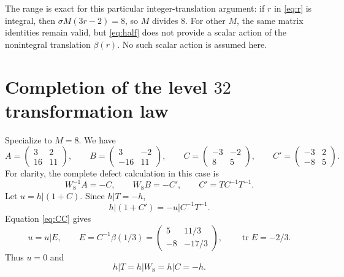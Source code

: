\documentclass[11pt]{article}
\theoremstyle{remark}
\newcommand{\bb}{\beta}
\newcommand{\tr}{\operatorname{tr}}
\begin{document}
The range is exact for this particular integer-translation argument:
if $r$ in \eqref{eq:r} is integral, then
$\sigma M(3r-2)=8$, so $M$ divides $8$. For other $M$, the same
matrix identities remain valid, but \eqref{eq:half} does not provide
a scalar action of the nonintegral translation $\bb(r)$.
No such scalar action is assumed here.

\section{Completion of the level \texorpdfstring{$32$}{32} transformation law}

Specialize to $M=8$. We have
\[
 A=\begin{pmatrix}3&2\\16&11\end{pmatrix},\qquad
 B=\begin{pmatrix}3&-2\\-16&11\end{pmatrix},\qquad
 C=\begin{pmatrix}-3&-2\\8&5\end{pmatrix},\qquad
 C'=\begin{pmatrix}-3&2\\-8&5\end{pmatrix}.
\]
For clarity, the complete defect calculation in this case is
\[
 W_8^{-1}A=-C,\qquad W_8B=-C',\qquad C'=TC^{-1}T^{-1}.
\]
Let $u=h|(1+C)$. Since $h|T=-h$,
\[
 h|(1+C')=-u|C^{-1}T^{-1}.
\]
Equation \eqref{eq:CC} gives
\begin{equation}\label{eq:explicitE}
 u=u|E,\qquad
 E=C^{-1}\bb(1/3)
  =\begin{pmatrix}5&11/3\\-8&-17/3\end{pmatrix},
 \qquad \tr E=-2/3.
\end{equation}
Thus $u=0$ and
\begin{equation}\label{eq:gensigns}
 h|T=h|W_8=h|C=-h.
\end{equation}
\end{document}
